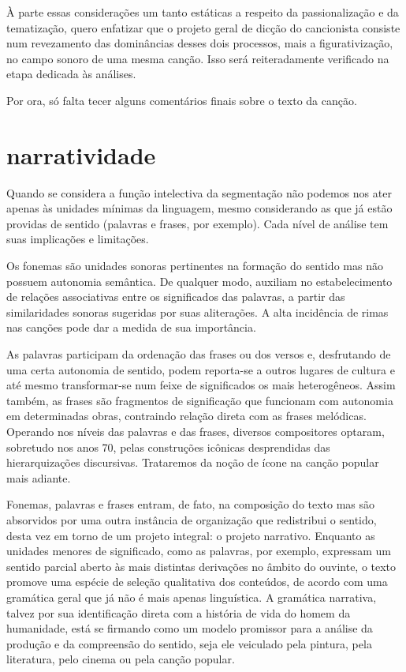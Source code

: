 À parte essas considerações um tanto estáticas a respeito da
passionalização e da tematização, quero enfatizar que o projeto geral de
dicção do cancionista consiste num revezamento das dominâncias desses
dois processos, mais a figurativização, no campo sonoro de uma mesma
canção. Isso será reiteradamente verificado na etapa dedicada às
análises.

Por ora, só falta tecer alguns comentários finais sobre o texto da
canção.

\section{narratividade}

Quando se considera a função intelectiva da segmentação não podemos nos
ater apenas às unidades mínimas da linguagem, mesmo considerando as que
já estão providas de sentido (palavras e frases, por exemplo). Cada
nível de análise tem suas implicações e limitações.

Os fonemas são unidades sonoras pertinentes na formação do sentido mas
não possuem autonomia semântica. De qualquer modo, auxiliam no
estabelecimento de relações associativas entre os significados das
palavras, a partir das similaridades sonoras sugeridas por suas
aliterações. A alta incidência de rimas nas canções pode dar a medida de
sua importância.

As palavras participam da ordenação das frases ou dos versos e,
desfrutando de uma certa autonomia de sentido, podem reporta-se a outros
lugares de cultura e até mesmo transformar-se num feixe de significados
os mais heterogêneos. Assim também, as frases são fragmentos de
significação que funcionam com autonomia em determinadas obras,
contraindo relação direta com as frases melódicas. Operando nos níveis
das palavras e das frases, diversos compositores optaram, sobretudo nos
anos 70, pelas construções icônicas desprendidas das hierarquizações
discursivas. Trataremos da noção de ícone na canção popular mais
adiante.

Fonemas, palavras e frases entram, de fato, na composição do texto mas
são absorvidos por uma outra instância de organização que redistribui o
sentido, desta vez em torno de um projeto integral: o projeto narrativo.
Enquanto as unidades menores de significado, como as palavras, por
exemplo, expressam um sentido parcial aberto às mais distintas
derivações no âmbito do ouvinte, o texto promove uma espécie de seleção
qualitativa dos conteúdos, de acordo com uma gramática geral que já não
é mais apenas linguística. A gramática narrativa, talvez por sua
identificação direta com a história de vida do homem da humanidade, está
se firmando como um modelo promissor para a análise da produção e da
compreensão do sentido, seja ele veiculado pela pintura, pela
literatura, pelo cinema ou pela canção popular. 

